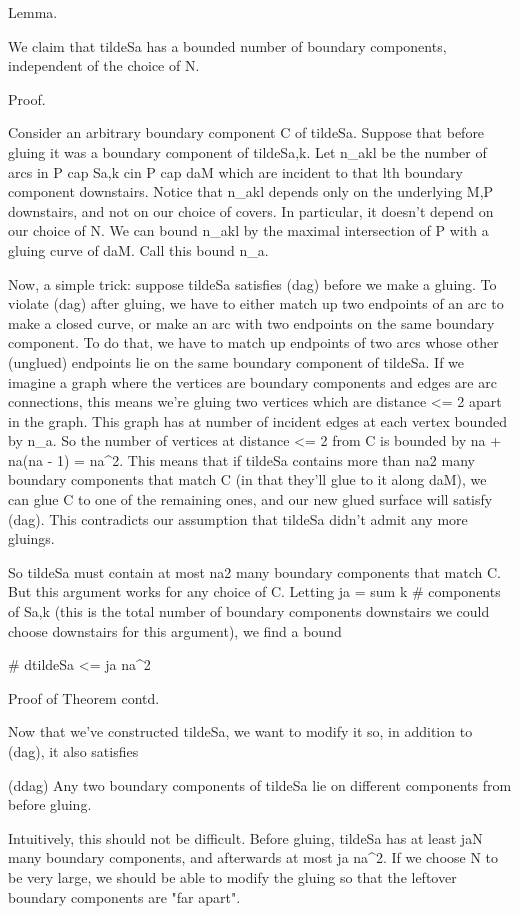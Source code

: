 \documentclass[12pt]{amsart}
\theoremstyle{definition}
\theoremstyle{remark}
\begin{document}
Lemma.

We claim that tildeSa has a bounded number of boundary components, independent
of the choice of N.

Proof.

Consider an arbitrary boundary component C of tildeSa.  Suppose that before
gluing it was a boundary component of tildeSa,k. Let n_akl be the number of
arcs in P cap Sa,k cin P cap daM which are incident to that lth boundary
component downstairs. Notice that n_akl depends only on the underlying M,P
downstairs, and not on our choice of covers. In particular, it doesn't depend
on our choice of N. We can bound n_akl by the maximal intersection of P with
a gluing curve of daM. Call this bound n_a.

Now, a simple trick: suppose tildeSa satisfies (dag) before we make a gluing.
To violate (dag) after gluing, we have to either match up two endpoints of an
arc to make a closed curve, or make an arc with two endpoints on the same
boundary component. To do that, we have to match up endpoints of two arcs whose
other (unglued) endpoints lie on the same boundary component of tildeSa. If we
imagine a graph where the vertices are boundary components and edges are arc
connections, this means we're gluing two vertices which are distance <= 2 apart
in the graph. This graph has at number of incident edges at each vertex bounded
by n_a. So the number of vertices at distance <= 2 from C is bounded by na
+ na(na - 1) = na^2. This means that if tildeSa contains more than na2 many
boundary components that match C (in that they'll glue to it along daM), we can
glue C to one of the remaining ones, and our new glued surface will satisfy
(dag). This contradicts our assumption that tildeSa didn't admit any more
gluings.

So tildeSa must contain at most na2 many boundary components that match C. But
this argument works for any choice of C. Letting ja = sum k # components of
Sa,k (this is the total number of boundary components downstairs we could
choose downstairs for this argument), we find a bound

# dtildeSa <= ja na^2

Proof of Theorem contd.

Now that we've constructed tildeSa, we want to modify it so, in addition to
(dag), it also satisfies

(ddag) Any two boundary components of tildeSa lie on different components from
before gluing.

Intuitively, this should not be difficult. Before gluing, tildeSa has at least
jaN many boundary components, and afterwards at most ja na^2. If we choose N to
be very large, we should be able to modify the gluing so that the leftover
boundary components are "far apart".
\end{document}
